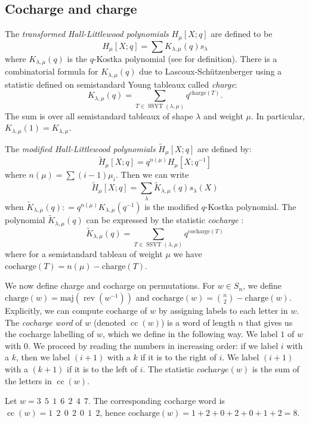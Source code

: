 \documentclass[ALCO, Unicode]{cedram}
\DeclareMathOperator{\ssyt}{SSYT}
\DeclareMathOperator{\rev}{rev}
\DeclareMathOperator{\cc}{cc}
\newcommand{\mHL}{\tilde{H}}
\begin{document}
\subsection{Cocharge and charge}\label{subsection:charge}
The \textit{transformed Hall-Littlewood polynomials} $H_\mu[X;q]$ are defined to be
\[H_\mu[X;q] = \sum K_{\lambda,\mu}(q) s_\lambda\]
where $K_{\lambda,\mu}(q)$ is the $q$-Kostka polynomial (see {\cite[Chapter III.6]{macdonald}} for definition). 
There is a combinatorial formula for $K_{\lambda,\mu}(q)$ due to Lascoux-Sch\"{u}tzenberger \cite{LS1} using a statistic defined on semistandard Young tableaux called \textit{charge}:
\[K_{\lambda,\mu}(q) = \sum\limits_{T\in \ssyt(\lambda,\mu)}  q^{\text{charge}(T)}.\] 
The sum is over all semistandard tableaux of shape $\lambda$ and weight $\mu$. In particular, $K_{\lambda,\mu}(1) = K_{\lambda,\mu}$.

The \textit{modified Hall-Littlewood polynomials} $\mHL_\mu [X;q]$ are defined by:
\[\mHL_\mu [X;q] = q^{n(\mu)} H_\mu[X;q^{-1}]\]
where $n(\mu) = \sum (i-1)\mu_i$.
Then we can write
\[ \tilde{H}_{\mu}[X;q] = \sum\limits_{\lambda}  \tilde{K}_{\lambda,\mu}(q) s_\lambda(X)\] when $\tilde{K}_{\lambda,\mu}(q): = q^{n(\mu)} K_{\lambda,\mu}(q^{-1})$ is the modified $q$-Kostka polynomial.
The polynomial $\tilde{K}_{\lambda,\mu}(q)$ can be expressed by the statistic \textit{cocharge} :\[\tilde{K}_{\lambda,\mu}(q) = \sum\limits_{T\in \ssyt(\lambda,\mu)}  q^{\text{cocharge}(T)}\]
where for a semistandard tableau of weight $\mu$ we have $\text{cocharge}(T) = n(\mu) - \text{charge}(T).$

We now define charge and cocharge on permutations.
For $w\in S_n$, we define $\text{charge}(w) = \text{maj}(\rev(w^{-1}))$ and $\text{cocharge}(w) = \binom{n}{2} - \text{charge}(w).$
Explicitly, we can compute $\text{cocharge}$ of $w$ by assigning labels to each letter in $w$.
The \textit{cocharge word} of $w$ (denoted $\cc(w)$) is a word of length $n$ that gives us the cocharge labelling of $w$, which we define in the following way. 
We label $1$ of $w$ with 0. We proceed by reading the numbers in increasing order: if we label $i$ with a $k$, then we label $(i+1)$ with a $k$ if it is to the right of $i$. We label $(i+1)$ with a $(k+1)$ if it is to the left of $i$.
The statistic $\textit{cocharge}(w)$  is the sum of the letters in $\cc(w)$. 

\begin{ex}\label{ex: cocharge word}
 Let $w = 3 \ \ 5 \ \ 1 \ \ 6\ \ 2 \ \ 4 \ \ 7 .$  
The corresponding cocharge word is $\cc(w)  = 1  \ \ 2 \ \ 0 \ \ 2 \ \ 0 \ \ 1 \ \ 2$, hence $\text{cocharge}(w) = 1 + 2 + 0 + 2 + 0 + 1 + 2 = 8.$
\end{ex}
\end{document}
